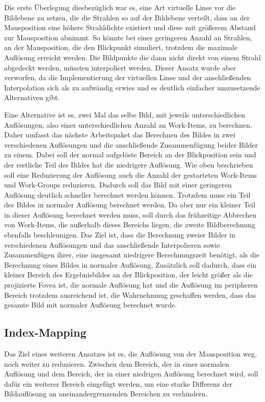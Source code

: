 Die erste Überlegung diesbezüglich war es, eine Art virtuelle Linse vor die Bildebene zu setzen, die die Strahlen so auf der Bildebene verteilt, dass an der Mausposition eine höhere Strahldichte existiert und diese mit größerem Abstand zur Mausposition abnimmt.
So könnte bei einer geringeren Anzahl an Strahlen, an der Mausposition, die den Blickpunkt simuliert, trotzdem die maximale Auflösung erreicht werden.
Die Bildpunkte die dann nicht direkt von einem Strahl abgedeckt werden, müssten interpoliert werden.
Dieser Ansatz wurde aber verworfen, da die Implementierung der virtuellen Linse und der anschließenden Interpolation sich als zu aufwändig erwies und es deutlich einfacher umzusetzende Alternativen gibt.

Eine Alternative ist es, zwei Mal das selbe Bild, mit jeweils unterschiedlichen Auflösungen, also einer unterschiedlichen Anzahl an Work-Items, zu berechnen.
Daher umfasst das nächste Arbeitspaket das Berechnen des Bildes in zwei verschiedenen Auflösungen und die anschließende Zusammenfügung beider Bilder zu einem.
Dabei soll der normal aufgelöste Bereich an der Blickposition sein und der restliche Teil des Bildes hat die niedrigere Auflösung.
Wie oben beschrieben soll eine Reduzierung der Auflösung auch die Anzahl der gestarteten Work-Items und Work-Groups reduzieren.
Dadurch soll das Bild mit einer geringeren Auflösung deutlich schneller berechnet werden können.
Trotzdem muss ein Teil des Bildes in normaler Auflösung berechnet werden.
Da aber nur ein kleiner Teil in dieser Auflösung berechnet werden muss, soll durch das frühzeitige Abbrechen von Work-Items, die außerhalb dieses Bereichs liegen, die zweite Bildberechnung ebenfalls beschleunigen.
Das Ziel ist, dass die Berechnung zweier Bilder in verschiedenen Auflösungen und das anschließende Interpolieren sowie Zusammenfügen ihrer, eine insgesamt niedrigere Berechnungszeit benötigt, als die Berechnung eines Bildes in normaler Auflösung.
Zusätzlich soll dadurch, dass ein kleiner Bereich des Ergebnisbildes an der Blickposition, der leicht größer als die projizierte Fovea ist, die normale Auflösung hat und die Auflösung im peripheren Bereich trotzdem ausreichend ist, die Wahrnehmung geschaffen werden, dass das gesamte Bild mit normaler Auflösung berechnet wurde.

\subsection{Index-Mapping}\label{ss::DDC}
Das Ziel eines weiteren Ansatzes ist es, die Auflösung von der Mausposition weg, noch weiter zu reduzieren.
Zwischen dem Bereich, der in einer normalen Auflösung und dem Bereich, der in einer niedrigen Auflösung berechnet wird, soll dafür ein weiterer Bereich eingefügt werden, um eine starke Differenz der Bildauflösung an aneinandergrenzenden Bereichen zu verhindern.

